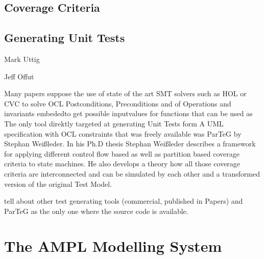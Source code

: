 \subsection{Coverage Criteria}


\subsection{Generating Unit Tests}
Mark Uttig

Jeff Offut

Many papers suppose the use of state of the art SMT solvers such as HOL or CVC to solve OCL Postconditions, Preconditions and  of Operations and invariants embededto get possible inputvalues for functions that can be used as 
The only tool direktly targeted at generating Unit Tests form A UML specification with OCL constraints that was freely available was ParTeG by Stephan Weißleder. In his Ph.D thesis Stephan Weißleder describes a framework for applying different control flow based as well as partition based coverage criteria to state machines. He also develops a theory how all those coverage criteria are interconnected and can be simulated by each other and a transformed version of the original Test Model\cite{ParTeG}.


tell about other test generating tools (commercial, published in Papers) and ParTeG as the only one where the source code is available.\cite{ParTeG}

\section{The AMPL Modelling System}
\cite{AMPL}
